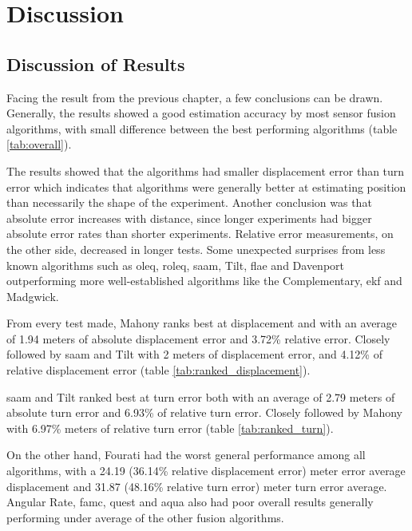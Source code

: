 \section{Discussion}
\subsection{Discussion of Results}
Facing the result from the previous chapter, a few conclusions can be drawn. Generally, the results showed a good estimation accuracy by most sensor fusion algorithms, with small difference between the best performing algorithms (table \ref{tab:overall}).



The results showed that the algorithms had smaller displacement error than turn error which indicates that algorithms were generally better at estimating position than necessarily the shape of the experiment. Another conclusion was that absolute error increases with distance, since longer experiments had bigger absolute error rates than shorter experiments. Relative error measurements, on the other side, decreased in longer tests. Some unexpected surprises from less known algorithms such as \acrshort{oleq}, \acrshort{roleq}, \acrshort{saam}, Tilt, \acrshort{flae} and Davenport outperforming more well-established algorithms like the Complementary, \acrshort{ekf} and Madgwick.

From every test made, Mahony ranks best at displacement and with an average of 1.94 meters of absolute displacement error and 3.72\% relative error. Closely followed by \acrshort{saam} and Tilt with 2 meters of displacement error, and 4.12\% of relative displacement error (table \ref{tab:ranked_displacement}).



\acrshort{saam} and Tilt ranked best at turn error both with an average of 2.79 meters of absolute turn error and 6.93\% of relative turn error. Closely followed by Mahony with 6.97\% meters of relative turn error (table \ref{tab:ranked_turn}).


On the other hand, Fourati had the worst general performance among all algorithms, with a 24.19 (36.14\% relative displacement error) meter error average displacement and 31.87 (48.16\% relative turn error) meter turn error average. Angular Rate, \acrshort{famc}, \acrshort{quest} and \acrshort{aqua} also had poor overall results generally performing under average of the other fusion algorithms.

